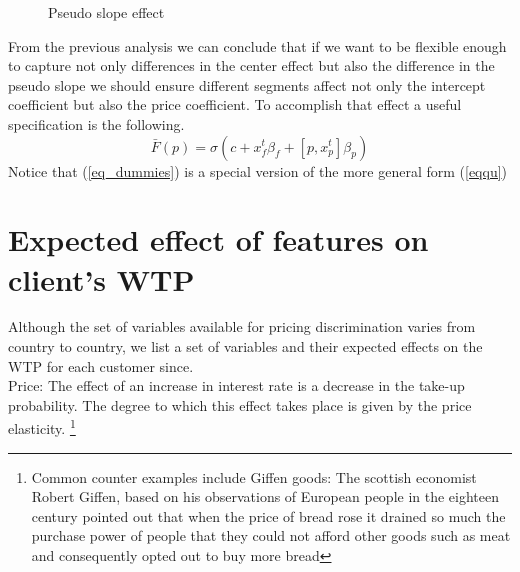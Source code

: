 \begin{figure}[H]
  \centering
 \caption{Pseudo slope effect }
 \label{fig:pslope_shift}
\end{figure}
From the previous analysis we can conclude that if we want to be flexible enough to capture not only differences in the center effect but also the difference in the pseudo slope we should ensure different segments affect not only the intercept coefficient but also the price coefficient. To accomplish that effect a useful specification is the following.
\begin{equation}
     \bar{F}(p) = \sigma(c+x_f^t\beta_f + [p , x_p^t] \beta_p) \label{eqqu}
\end{equation}
Notice that (\ref{eq_dummies}) is a special version of the more general form (\ref{eqqu})
\section{Expected effect of features on client's WTP}

Although the set of variables available for pricing discrimination varies from country to country, we list a set of variables and their expected effects on the WTP for each customer since. \\

Price: The effect of an increase in interest rate is a decrease in the take-up probability. The degree to which this effect takes place is given by the price elasticity. \footnote{Common counter examples include Giffen goods: The scottish economist Robert Giffen, based on his observations of European people in the eighteen century pointed out that when the price of bread rose it drained so much the purchase power of people that they could not afford other goods such as meat and consequently opted out to buy more bread }\\

